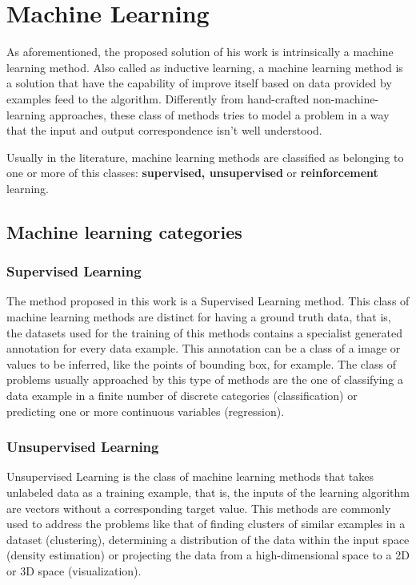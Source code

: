 \section{Machine Learning}
As aforementioned, the proposed solution of his work is intrinsically a machine learning method. Also called as inductive learning, a machine learning method is a solution that have the capability of improve itself based on data provided by examples feed to the algorithm. Differently from hand-crafted non-machine-learning approaches, these class of methods tries to model a problem in a way that the input and output correspondence isn't well understood\cite{Shukla2018}. 

Usually in the literature\cite{Shukla2018,russell2016,bishop2006}, machine learning methods are classified as belonging to one or more of this classes: \textbf{supervised, unsupervised} or \textbf{reinforcement} learning.
\subsection{Machine learning categories}
\subsubsection{Supervised Learning}
The method proposed in this work is a Supervised Learning method. This class of machine learning methods are distinct for having a ground truth data, that is, the datasets used for the training of this methods contains a specialist generated annotation for every data example. This annotation can be a class of a image or values to be inferred, like the points of bounding box, for example\cite{Shukla2018}. The class of problems usually approached by this type of methods are the one of classifying a data example in a finite number of discrete categories (classification) or predicting one or more continuous variables (regression). 

\subsubsection{Unsupervised Learning}
Unsupervised Learning is the class of machine learning methods that takes unlabeled data as a training example, that is, the inputs of the learning algorithm are vectors without a corresponding target value. This methods are commonly used to address the problems like that of finding clusters of similar examples in a dataset (clustering), determining a distribution of the data within the input space (density estimation) or projecting the data from a high-dimensional space to a 2D or 3D space (visualization). \cite{bishop2006}


